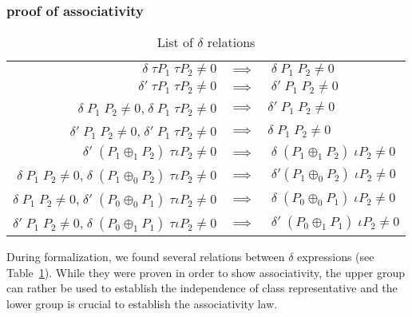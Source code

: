 \documentclass{llncs}
\begin{document}
\subsubsection{proof of associativity}

\begin{table}
\begin{center}
\begin{tabular}{ r c l }
  $\delta \; \tau P_1 \; \tau P_2 \neq 0$
  & $\implies$ & $\; \delta \; P_1 \; P_2 \neq 0$ \\ 
  $\delta' \; \tau P_1 \; \tau P_2 \neq 0$
  & $\implies$ & $\; \delta' \; P_1 \; P_2 \neq 0$ \\ 
  $\delta \; P_1 \; P_2 \neq 0$,\quad $\; \delta \; P_1 \; \tau P_2 \neq 0$
  & $\implies$ & $\delta' \; P_1 \; P_2 \neq 0$ \\ 
  $\delta' \; P_1 \; P_2 \neq 0$,\quad $\; \delta' \; P_1 \; \tau P_2 \neq 0$
  & $\implies$ & $\delta \; P_1 \;P_2 \neq 0$ \\
%  
  \hline
%
  $\delta' \; (P_1 \oplus_1 P_2) \; \tau \iota P_2 \neq 0$
  & $\implies$ & $\; \delta \; (P_1 \oplus_1 P_2) \; \iota P_2 \neq 0$ \\ 
  $\delta \; P_1 \; P_2 \neq 0$,\quad $\; \delta \; (P_1 \oplus_0 P_2) \; \tau \iota P_2 \neq 0$
  & $\implies$ & $\; \delta' (P_1 \oplus_0 P_2) \; \iota P_2 \neq 0$ \\ 
  $\delta \; P_1 \; P_2 \neq 0$,\quad $\; \delta' \; (P_0 \oplus_0 P_1) \; \tau \iota P_2 \neq 0$
  & $\implies$ & $\; \delta \; (P_0 \oplus_0 P_1) \; \iota P_2 \neq 0$ \\ 	    
  $\delta' \; P_1 \; P_2 \neq 0$,\quad $\; \delta \; (P_0 \oplus_1 P_1) \; \tau \iota P_2 \neq 0$
  & $\implies$ & $\; \delta' \; (P_0 \oplus_1 P_1) \; \iota P_2 \neq 0$ \\
\end{tabular}
\end{center}
	\caption{List of $\delta$ relations}
	\label{table:1}
\end{table}

During formalization, we found several relations between $\delta$
expressions (see Table~\ref{table:1}). While they were proven in order
to show associativity, the upper group can rather be used to establish
the independence of class representative and the lower group is
crucial to establish the associativity law.
\end{document}
